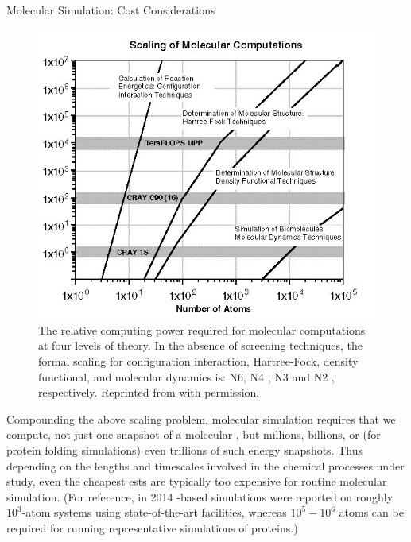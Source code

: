 \begin{section}{Molecular Simulation: Cost Considerations}
\begin{figure}
\centering
\includegraphics[width=\textwidth]{intro/scale.png}
\caption{
The relative computing power required for molecular computations at four
levels of theory. In the absence of screening techniques, the formal scaling
for configuration interaction, Hartree-Fock, density functional, and molecular
dynamics is: N6, N4 , N3 and N2 , respectively.
Reprinted from  with permission.
    }
\label{fig:intro-scaling}
\end{figure}

Compounding the above scaling problem, molecular simulation requires that we
compute,
not just one snapshot of a molecular \pes, but millions, billions, or 
(for protein folding simulations) even trillions of such energy snapshots.
Thus depending on the lengths and timescales
involved in the chemical processes under study, even the cheapest \dft \glspl{est}
are typically too expensive for routine molecular simulation.
(For reference, in 2014 \dft-based simulations were reported on 
roughly $10^3$-atom systems using state-of-the-art facilities,
\cite{Ballone2014}
whereas $10^5-10^6$ atoms can be required for running representative
simulations of proteins.\cite{Karplus2002,Lane2013})


\end{section}
